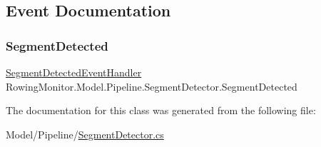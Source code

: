 \subsection{Event Documentation}
\mbox{\label{class_rowing_monitor_1_1_model_1_1_pipeline_1_1_segment_detector_aecedec106356c5d32e43e9c9471f12a3}} 
\subsubsection{\texorpdfstring{Segment\+Detected}{SegmentDetected}}
{\footnotesize\ttfamily \hyperlink{class_rowing_monitor_1_1_model_1_1_pipeline_1_1_segment_detector_aee5283f7fa49f68c5c4195449442093c}{Segment\+Detected\+Event\+Handler} Rowing\+Monitor.\+Model.\+Pipeline.\+Segment\+Detector.\+Segment\+Detected}



The documentation for this class was generated from the following file\+:\begin{DoxyCompactItemize}
\item 
Model/\+Pipeline/\hyperlink{_segment_detector_8cs}{Segment\+Detector.\+cs}\end{DoxyCompactItemize}
